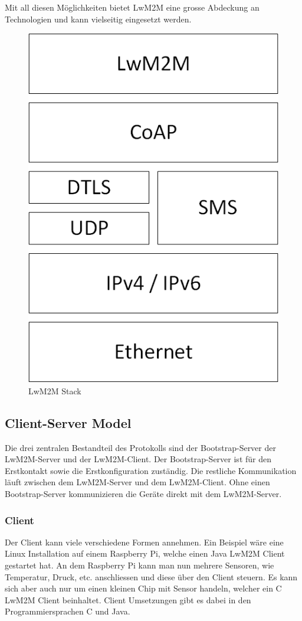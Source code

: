 Mit all diesen Möglichkeiten bietet LwM2M eine grosse Abdeckung an Technologien und kann vielseitig eingesetzt werden. 
\begin{figure}[H]
\includegraphics[scale=0.3]{images/lwm2m/stack.png}
\caption{LwM2M Stack}
\end{figure}

\subsection{Client-Server Model}
Die drei zentralen Bestandteil des Protokolls sind der Bootstrap-Server der LwM2M-Server und der LwM2M-Client. Der Bootstrap-Server ist für den Erstkontakt sowie die Erstkonfiguration zuständig. Die restliche Kommunikation läuft zwischen dem LwM2M-Server und dem LwM2M-Client. Ohne einen Bootstrap-Server kommunizieren die Geräte direkt mit dem LwM2M-Server.
\subsubsection{Client}
Der Client kann viele verschiedene Formen annehmen. Ein Beispiel wäre eine Linux Installation auf einem Raspberry Pi, welche einen Java LwM2M Client gestartet hat. An dem Raspberry Pi kann man nun mehrere Sensoren, wie Temperatur, Druck, etc. anschliessen und diese über den Client steuern. Es kann sich aber auch nur um einen kleinen Chip mit Sensor handeln, welcher ein C LwM2M Client beinhaltet. Client Umsetzungen gibt es dabei in den Programmiersprachen C und Java.
